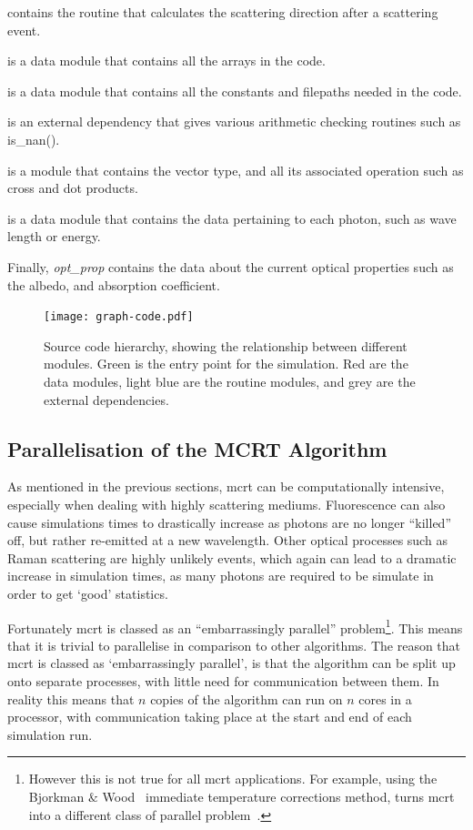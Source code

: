  contains the routine that calculates the scattering direction after a scattering event.

 is a data module that contains all the arrays in the code.

 is a data module that contains all the constants and filepaths needed in the code.

 is an external dependency that gives various arithmetic checking routines such as is_nan().

 is a module that contains the vector type, and all its associated operation such as cross and dot products.

 is a data module that contains the data pertaining to each photon, such as wave length or energy.

\noindent Finally, {\color{red} \textit{opt_prop}} contains the data about the current optical properties such as the albedo, and absorption coefficient.


\begin{figure}[!ht]
	\centering
	\texttt{[image: graph-code.pdf]}
	\caption{Source code hierarchy, showing the relationship between different modules. Green is the entry point for the simulation. Red are the data modules, light blue are the routine modules, and grey are the external dependencies.}
	\label{fig:codegraph}
\end{figure}



\subsection*{Parallelisation of the MCRT Algorithm}\label{sec:parasec}

As mentioned in the previous sections, \gls*{mcrt} can be computationally intensive, especially when dealing with highly scattering mediums. Fluorescence can also cause simulations times to drastically increase as photons are no longer ``killed'' off, but rather re-emitted at a new wavelength. Other optical processes such as Raman scattering are highly unlikely events, which again can lead to a dramatic increase in simulation times, as many photons are required to be simulate in order to get `good' statistics.

Fortunately \gls*{mcrt} is classed as an ``embarrassingly parallel'' problem\footnote{However this is not true for all \gls*{mcrt} applications. For example, using the Bjorkman $\&$ Wood~\cite{bjorkman2001radiative} immediate temperature corrections method, turns \gls*{mcrt} into a different class of parallel problem~\cite{robitaille2011hyperion}.}.
This means that it is trivial to parallelise in comparison to other algorithms. 
The reason that \gls*{mcrt} is classed as `embarrassingly parallel', is that the algorithm can be split up onto separate processes, with little need for communication between them. 
In reality this means that $n$ copies of the algorithm can run on $n$ cores in a processor, with communication taking place at the start and end of each simulation run. 

